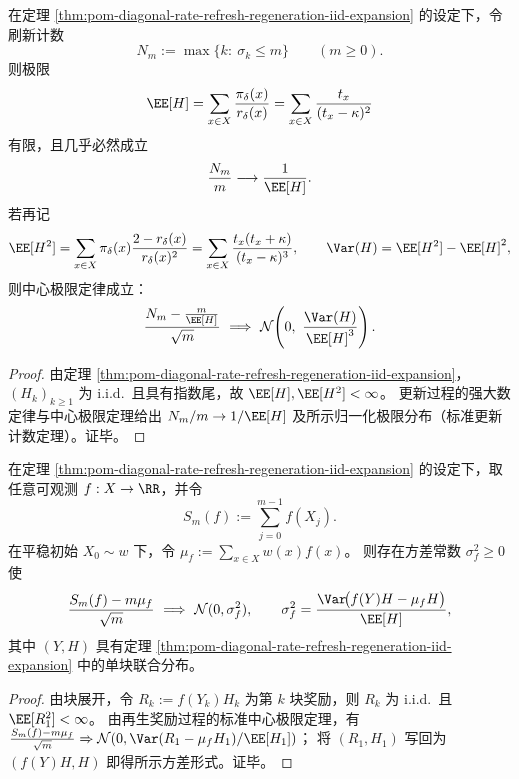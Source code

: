 \begin{theorem}[刷新计数的更新极限定理]\label{thm:pom-diagonal-rate-refresh-count-renewal-lln-clt}
在定理 \ref{thm:pom-diagonal-rate-refresh-regeneration-iid-expansion} 的设定下，令刷新计数
\[
N_m:=\max\{k:\ \sigma_k\le m\}\qquad(m\ge 0).
\]
则极限
\[
\EE[H]=\sum_{x\in X}\frac{\pi_\delta(x)}{r_\delta(x)}=\sum_{x\in X}\frac{t_x}{(t_x-\kappa)^2}
\]
有限，且几乎必然成立
\[
\frac{N_m}{m}\longrightarrow \frac{1}{\EE[H]}.
\]
若再记
\[
\EE[H^2]=\sum_{x\in X}\pi_\delta(x)\frac{2-r_\delta(x)}{r_\delta(x)^2}
=\sum_{x\in X}\frac{t_x(t_x+\kappa)}{(t_x-\kappa)^3},
\qquad
\Var(H)=\EE[H^2]-\EE[H]^2,
\]
则中心极限定律成立：
\[
\frac{N_m-\frac{m}{\EE[H]}}{\sqrt m}\ \Longrightarrow\ \mathcal N\!\left(0,\ \frac{\Var(H)}{\EE[H]^3}\right).
\]
\end{theorem}
\begin{proof}
由定理 \ref{thm:pom-diagonal-rate-refresh-regeneration-iid-expansion}，\((H_k)_{k\ge 1}\) 为 i.i.d.\ 且具有指数尾，故 \(\EE[H],\EE[H^2]<\infty\)。
更新过程的强大数定律与中心极限定理给出 \(N_m/m\to 1/\EE[H]\) 及所示归一化极限分布（标准更新计数定理）。证毕。
\end{proof}

\begin{theorem}[再生奖励的中心极限定理与显式方差]\label{thm:pom-diagonal-rate-refresh-reward-clt-variance}
在定理 \ref{thm:pom-diagonal-rate-refresh-regeneration-iid-expansion} 的设定下，取任意可观测 \(f:X\to\RR\)，并令
\[
S_m(f):=\sum_{j=0}^{m-1}f(X_j).
\]
在平稳初始 \(X_0\sim w\) 下，令 \(\mu_f:=\sum_{x\in X}w(x)f(x)\)。
则存在方差常数 \(\sigma_f^2\ge 0\) 使
\[
\frac{S_m(f)-m\mu_f}{\sqrt m}\ \Longrightarrow\ \mathcal N(0,\sigma_f^2),
\qquad
\sigma_f^2=\frac{\Var\!\bigl(f(Y)H-\mu_f H\bigr)}{\EE[H]},
\]
其中 \((Y,H)\) 具有定理 \ref{thm:pom-diagonal-rate-refresh-regeneration-iid-expansion} 中的单块联合分布。
\end{theorem}
\begin{proof}
由块展开，令 \(R_k:=f(Y_k)H_k\) 为第 \(k\) 块奖励，则 \(R_k\) 为 i.i.d.\ 且 \(\EE[R_1^2]<\infty\)。
由再生奖励过程的标准中心极限定理，有
\(
\frac{S_m(f)-m\mu_f}{\sqrt m}\Rightarrow\mathcal N(0,\Var(R_1-\mu_f H_1)/\EE[H_1])
\)；
将 \((R_1,H_1)\) 写回为 \((f(Y)H,H)\) 即得所示方差形式。证毕。
\end{proof}

